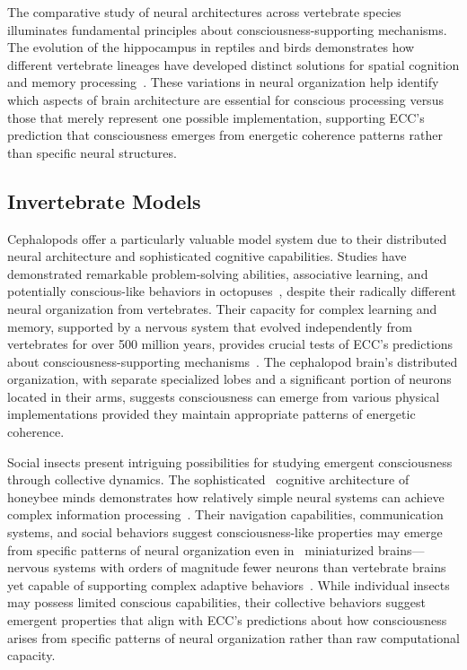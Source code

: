 The comparative study of neural architectures across vertebrate species illuminates fundamental principles about consciousness-supporting mechanisms. The evolution of the hippocampus in reptiles and birds demonstrates how different vertebrate lineages have developed distinct solutions for spatial cognition and memory processing~\cite{Striedter2016}. These variations in neural organization help identify which aspects of brain architecture are essential for conscious processing versus those that merely represent one possible implementation, supporting ECC's prediction that consciousness emerges from energetic coherence patterns rather than specific neural structures.

\subsection*{Invertebrate Models}

 Cephalopods offer a particularly valuable model system due to their distributed neural architecture and sophisticated cognitive capabilities. Studies have demonstrated remarkable problem-solving abilities, associative learning, and potentially conscious-like behaviors in octopuses~\cite{Mather2008}, despite their radically different neural organization from vertebrates. Their capacity for complex learning and memory, supported by a nervous system that evolved independently from vertebrates for over 500 million years, provides crucial tests of ECC's predictions about consciousness-supporting mechanisms~\cite{Teyke1989}. The cephalopod brain's distributed organization, with separate specialized lobes and a significant portion of neurons located in their arms, suggests consciousness can emerge from various physical implementations provided they maintain appropriate patterns of energetic coherence.

 Social insects present intriguing possibilities for studying emergent consciousness through collective dynamics. The sophisticated~ cognitive architecture of honeybee minds demonstrates how relatively simple neural systems can achieve complex information processing~\cite{Menzel2001, lyon2021reframing}. Their navigation capabilities, communication systems, and social behaviors suggest consciousness-like properties may emerge from specific patterns of neural organization even in~ miniaturized brains—nervous systems with orders of magnitude fewer neurons than vertebrate brains yet capable of supporting complex adaptive behaviors~\cite{Webb2016}. While individual insects may possess limited conscious capabilities, their collective behaviors suggest emergent properties that align with ECC's predictions about how consciousness arises from specific patterns of neural organization rather than raw computational capacity.


